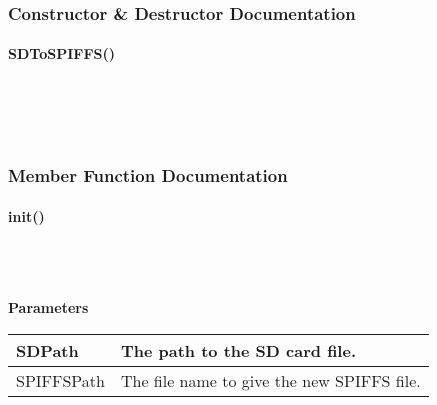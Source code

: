     \subsubsection{Constructor \& Destructor Documentation}\mbox{}


        \paragraph{SDToSPIFFS()}\mbox{}\\

            \\

            \\


    \subsubsection{Member Function Documentation}\mbox{}


        \paragraph{init()}\mbox{}\\

            \\


            \textbf{Parameters}

            \vspace{1em}
            \begin{tabular}{| l | l |} 
                \hline
                SDPath & The path to the SD card file. \\ 
                \hline
                SPIFFSPath & The file name to give the new SPIFFS file. \\ 
                \hline
            \end{tabular}\\~\\


